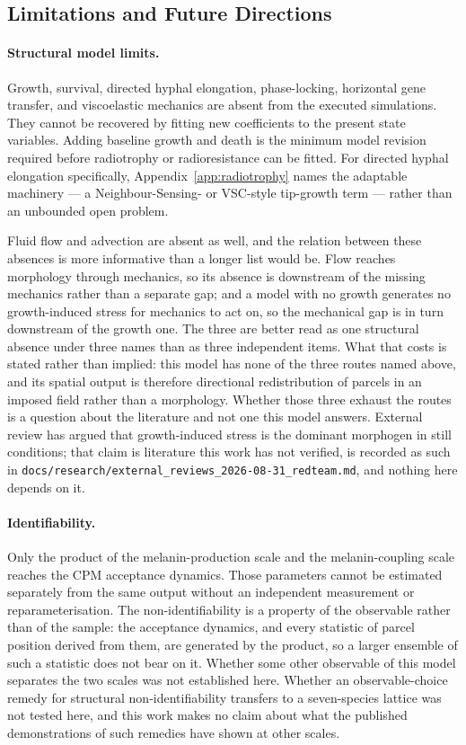 \documentclass[11pt]{article}
\begin{document}
\subsection{Limitations and Future Directions}
\label{sec:limitations}

\paragraph{Structural model limits.}
Growth, survival, directed hyphal elongation, phase-locking, horizontal gene transfer, and
viscoelastic mechanics are absent from the executed simulations. They cannot be recovered by fitting
new coefficients to the present state variables. Adding baseline growth and death is the minimum
model revision required before radiotrophy or radioresistance can be fitted. For directed hyphal
elongation specifically, Appendix~\ref{app:radiotrophy} names the adaptable machinery ---
a Neighbour-Sensing- or VSC-style tip-growth term \cite{meskauskas2004,bartnickigarcia1989} ---
rather than an unbounded open problem.

Fluid flow and advection are absent as well, and the relation between these absences is more
informative than a longer list would be. Flow reaches morphology through mechanics, so its
absence is downstream of the missing mechanics rather than a separate gap; and a model with
no growth generates no growth-induced stress for mechanics to act on, so the mechanical gap
is in turn downstream of the growth one. The three are better read as one structural absence
under three names than as three independent items. What that costs is stated rather than
implied: this model has none of the three routes named above, and its spatial output is
therefore directional redistribution of parcels in an imposed field rather than a morphology.
Whether those three exhaust the routes is a question about the literature and not one this
model answers.
External review has argued that growth-induced stress is the dominant morphogen in still
conditions; that claim is literature this work has not verified, is recorded as such in
\texttt{docs/research/external\_reviews\_2026-08-31\_redteam.md}, and nothing here
depends on it.

\paragraph{Identifiability.}
Only the product of the melanin-production scale and the melanin-coupling scale reaches the CPM
acceptance dynamics. Those parameters cannot be estimated separately from the same output without
an independent measurement or reparameterisation. The non-identifiability is a property of the observable
rather than of the sample: the acceptance dynamics, and every statistic of parcel position derived
from them, are generated by the product, so a larger ensemble of such a statistic does not bear on
it. Whether some other observable of this model separates the two scales was not established here.
Whether an observable-choice remedy for structural non-identifiability transfers to a
seven-species lattice was not tested here, and this work makes no claim about what the
published demonstrations of such remedies have shown at other scales.
\end{document}

